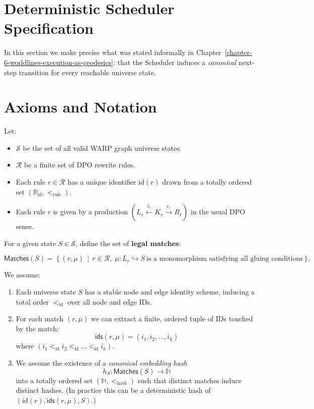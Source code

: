 \section{Deterministic Scheduler Specification}
\label{sec:scheduler-spec}

In this section we make precise what was stated informally in
Chapter~\ref{chapter-6-worldlines-execution-as-geodesics}: that the
Scheduler induces a \emph{canonical} next-step transition for every
reachable universe state.

\section{Axioms and Notation}

Let:

\begin{itemize}
    \item $\mathcal{S}$ be the set of all valid WARP graph universe states.
    \item $\mathcal{R}$ be a finite set of DPO rewrite rules.
    \item Each rule $r \in \mathcal{R}$ has a unique identifier $\mathrm{id}(r)$
          drawn from a totally ordered set $(\mathbb{R}_{\text{id}}, <_{\text{rule}})$.
    \item Each rule $r$ is given by a production $(L_r \xleftarrow{l_r} K_r \xrightarrow{r_r} R_r)$
          in the usual DPO sense.
\end{itemize}

For a given state $S \in \mathcal{S}$, define the set of \textbf{legal matches}:

\[
\mathsf{Matches}(S)
= \left\{ (r, \mu) \,\middle|\,
    r \in \mathcal{R},\;
    \mu : L_r \hookrightarrow S\ \text{is a monomorphism satisfying all gluing conditions}
    \right\}.
\]

We assume:

\begin{enumerate}
    \item Each universe state $S$ has a stable node and edge identity scheme,
          inducing a total order $<_{\text{id}}$ over all node and edge IDs.
    \item For each match $(r, \mu)$ we can extract a finite, ordered tuple of IDs
          touched by the match:
          \[
          \mathsf{ids}(r, \mu) = (i_1, i_2, \dots, i_k)
          \]
          where $(i_1 <_{\text{id}} i_2 <_{\text{id}} \dots <_{\text{id}} i_k)$.
    \item We assume the existence of a \emph{canonical embedding hash}
          \[
          h_S : \mathsf{Matches}(S) \to \mathbb{H}
          \]
          into a totally ordered set $(\mathbb{H}, <_{\text{hash}})$ such that
          distinct matches induce distinct hashes. (In practice this can be a
          deterministic hash of $(\mathrm{id}(r), \mathsf{ids}(r,\mu), S)$.)
\end{enumerate}

